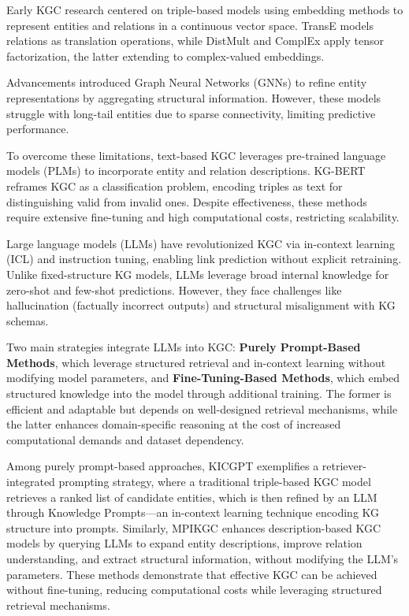 \documentclass[12pt,a4paper]{article}
\begin{document}
Early KGC research centered on triple-based models using embedding methods to represent entities and relations in a continuous vector space. TransE \cite{bordes2013translating} models relations as translation operations, while DistMult \cite{yang2014embedding} and ComplEx \cite{trouillon2016complex} apply tensor factorization, the latter extending to complex-valued embeddings.

Advancements introduced Graph Neural Networks (GNNs) \cite{schlichtkrull2018modeling} to refine entity representations by aggregating structural information. However, these models struggle with long-tail entities due to sparse connectivity, limiting predictive performance.

To overcome these limitations, text-based KGC leverages pre-trained language models (PLMs) to incorporate entity and relation descriptions. KG-BERT \cite{yao2019kgbert} reframes KGC as a classification problem, encoding triples as text for distinguishing valid from invalid ones. Despite effectiveness, these methods require extensive fine-tuning and high computational costs, restricting scalability.

Large language models (LLMs) have revolutionized KGC via in-context learning (ICL) and instruction tuning, enabling link prediction without explicit retraining. Unlike fixed-structure KG models, LLMs leverage broad internal knowledge for zero-shot and few-shot predictions. However, they face challenges like hallucination (factually incorrect outputs) and structural misalignment with KG schemas.

Two main strategies integrate LLMs into KGC: \textbf{Purely Prompt-Based Methods}, which leverage structured retrieval and in-context learning without modifying model parameters, and \textbf{Fine-Tuning-Based Methods}, which embed structured knowledge into the model through additional training. The former is efficient and adaptable but depends on well-designed retrieval mechanisms, while the latter enhances domain-specific reasoning at the cost of increased computational demands and dataset dependency.

Among purely prompt-based approaches, KICGPT \cite{wei2023kicgpt} exemplifies a retriever-integrated prompting strategy, where a traditional triple-based KGC model retrieves a ranked list of candidate entities, which is then refined by an LLM through Knowledge Prompts—an in-context learning technique encoding KG structure into prompts. Similarly, MPIKGC \cite{xu2024mpikgc} enhances description-based KGC models by querying LLMs to expand entity descriptions, improve relation understanding, and extract structural information, without modifying the LLM's parameters. These methods demonstrate that effective KGC can be achieved without fine-tuning, reducing computational costs while leveraging structured retrieval mechanisms.
\end{document}
